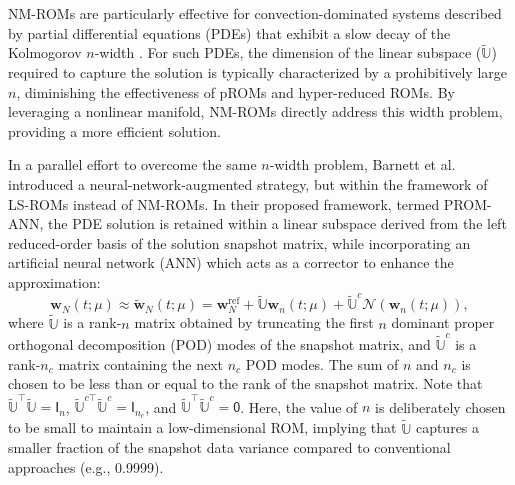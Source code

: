 \documentclass[11pt]{article}
\renewcommand{\vec}[1]{\mathbf{#1}}
\newcommand{\mat}[1]{\mathsf{#1}}
\begin{document}
            NM-ROMs are particularly effective for convection-dominated systems described by partial differential equations (PDEs) that exhibit a slow decay of the Kolmogorov $n$-width \cite{lee2020model}.
            For such PDEs, the dimension of the linear subspace (\(\widetilde{\mathbb{U}}\)) required to capture the solution is typically characterized by a prohibitively large $n$, diminishing the effectiveness of pROMs and hyper-reduced ROMs.
            By leveraging a nonlinear manifold, NM-ROMs directly address this width problem, providing a more efficient solution.


            In a parallel effort to overcome the same $n$-width problem, Barnett et al.
            \cite{barnett2023neural-network-augmenteda} introduced a neural-network-augmented strategy, but within the framework of LS-ROMs instead of NM-ROMs.
            In their proposed framework, termed PROM-ANN, the PDE solution is retained within a linear subspace derived from the left reduced-order basis of the solution snapshot matrix, while incorporating an artificial neural network (ANN) which acts as a corrector to enhance the approximation:
            \begin{equation}
              \vec{w}_N(t; \mu) \approx \widetilde{\mathbf{w}}_N(t; \mu) = \mathbf{w}_N^{\text{ref}} +  \widetilde{\mathbb{U}} \vec{w}_n(t; \mu) + \widetilde{\mathbb{U}}^{c} \mathscr{N}(\vec{w}_n(t; \mu)),
              \label{eq:pROM_idea}
            \end{equation}
            where \(\widetilde{\mathbb{U}}\) is a rank-\(n\) matrix obtained by truncating the first \(n\) dominant proper orthogonal decomposition (POD) modes of the snapshot matrix, and \(\widetilde{\mathbb{U}}^c\) is a rank-\(n_c\) matrix containing the next \(n_c\) POD modes.
            The sum of \(n\) and \(n_c\) is chosen to be less than or equal to the rank of the snapshot matrix.
            Note that \(\widetilde{\mathbb{U}}^\top \widetilde{\mathbb{U}} = \mat{I}_n\), \(\widetilde{\mathbb{U}}^{c\top} \widetilde{\mathbb{U}}^{c} = \mat{I}_{n_c}\), and \(\widetilde{\mathbb{U}}^\top \widetilde{\mathbb{U}}^c = \mat{0}\).
            Here, the value of \(n\) is deliberately chosen to be small to maintain a low-dimensional ROM, implying that \(\widetilde{\mathbb{U}}\) captures a smaller fraction of the snapshot data variance compared to conventional approaches (e.g., 0.9999).
\end{document}
